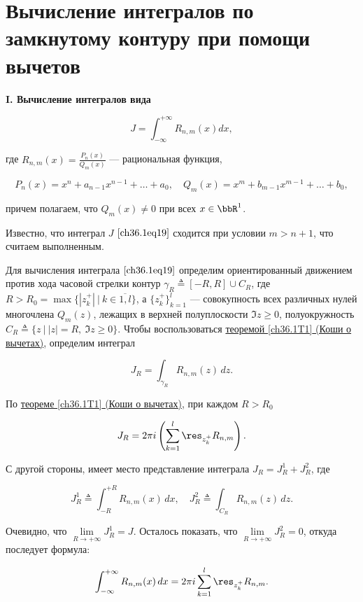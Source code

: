 \section{Вычисление интегралов по замкнутому контуру при помощи вычетов}

{\bf I. Вычисление интегралов вида}

\begin{equation} \label{ch36.1eq19}
J = \int_{-\infty}^{+\infty} R_{n,m} (x) dx,
\end{equation}

где $R_{n,m}(x) = \frac{P_n(x)}{Q_m(x)}$ --- рациональная функция,

$$
P_n(x) = x^n + a_{n - 1} x^{n - 1} + \ldots + a_0, \quad
Q_m(x) = x^m + b_{m - 1} x^{m - 1} + \ldots + b_0,
$$

причем полагаем, что $Q_m(x) \not= 0$ при всех $x \in \bbR^1$.

Известно, что интеграл $J$ $\eqref{ch36.1eq19}$ сходится при условии $m > n + 1$, что считаем выполненным.

Для вычисления интеграла $\eqref{ch36.1eq19}$ определим ориентированный движением против хода часовой стрелки контур $\gamma_R \triangleq [-R, R] \cup C_R$, где $R > R_0 = \max\{ |z_k^{+}| \: \big| \: k \in \overline{1,l} \}$, а $ \{ z_{k}^{+} \}^l_{k = 1}$ --- совокупность всех различных нулей многочлена $Q_m(z)$, лежащих в верхней полуплоскости $\Im z \ge 0$, полуокружность $C_R \triangleq \{ z \: \big| \: |z| = R, \: \Im z \ge 0 \}$. Чтобы воспользоваться \hyperref[ch36.1T1]{теоремой \ref{ch36.1T1} (Коши о вычетах)}, определим интеграл 

$$
J_R = \int_{\gamma_R} R_{n,m}(z)\,dz.
$$

По \hyperref[ch36.1T1]{теореме \ref{ch36.1T1} (Коши о вычетах)}, при каждом $R > R_0$

$$
J_R = 2\pi i\left( \sum_{k = 1}^{l} \res_{z_k^+} R_{n,m}\right).
$$

С другой стороны, имеет место представление интеграла $J_R = J_R^1 + J_R^2$, где 

\begin{equation} \label{ch36.1eq20}
J_R^1 \triangleq \int_{-R}^{+R} R_{n,m}(x)\,dx, \quad J_R^2 \triangleq \int_{C_R} R_{n,m}(z)\,dz.
\end{equation}

Очевидно, что $\lim\limits_{R \to +\infty} J_R^1 = J$. Осталось показать, что $\lim\limits_{R \to +\infty}J_R^2 = 0$, откуда последует формула:

\begin{equation} \label{ch36.1eq21}
\int_{-\infty}^{+\infty}R_{n,m}(x)\,dx = 2\pi i\sum_{k = 1}^{l} \res_{z_k^+} R_{n,m}.
\end{equation}

